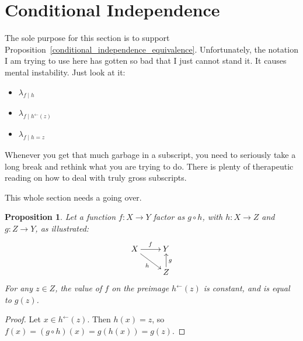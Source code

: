 \documentclass[
twoside=true,
paper=letter,
fontsize=11pt,
pagesize=auto,
leqno,
openany,
headsepline,
overfullrule,
]{scrbook}
\theoremstyle{plain}
\theoremstyle{plain}
\newtheorem{prop}[thm]{Proposition}
\theoremstyle{definition}
\theoremstyle{bfnoteitalic}
\theoremstyle{bfnoteroman}
\newcommand{\preimage}[1]{#1^{\leftarrow}}
\newcommand{\function}{f}
\newcommand{\functionii}{g}
\newcommand{\functioniii}{h}
\newcommand{\measurespace}{X}
\newcommand{\measurespaceii}{Y}
\newcommand{\measurespaceiii}{Z}
\newcommand{\mspaceelt}{x}
\newcommand{\mspaceeltiii}{z}
\newcommand{\measureiii}{\lambda}
\newcommand{\mkernel}[3]{#1_{#2\mid#3}}
\begin{document}
\section{Conditional Independence}

The sole purpose for this section is to support Proposition~\ref{conditional_independence_equivalence}. Unfortunately, the notation I am trying to use here has gotten so bad that I just cannot stand it.  It causes mental instability. Just look at it:
\begin{itemize}
\item
$\mkernel{\measureiii}{\function}{\functioniii}$
\item
$\mkernel{\measureiii}{\function}{\preimage{\functioniii}(\mspaceeltiii)}$
\item
$\mkernel{\measureiii}{\function}{\functioniii = \mspaceeltiii}$
\end{itemize}
Whenever you get that much garbage in a subscript, you need to seriously take a long break and rethink what you are trying to do. There is plenty of therapeutic reading on how to deal with truly gross subscripts.

This whole section needs a going over.


\begin{prop}\label{constant_on_preimage}
Let a function
$\function:\measurespace\to\measurespaceii$
factor as 
$\functionii\circ\functioniii$, 
with
$\functioniii:\measurespace\to\measurespaceiii$
and
$\functionii:\measurespaceiii\to\measurespaceii$,
as illustrated:
\[
\xymatrix@R=16pt{
\measurespace 
\ar[r]^\function 
\ar[dr]_\functioniii
& \measurespaceii \\
 & \measurespaceiii \ar[u]_\functionii \\
}
\]
For any $\mspaceeltiii\in\measurespaceiii$, the value of $\function$ on the preimage
$\preimage{\functioniii}(\mspaceeltiii)$ is constant, and is equal to
$\functionii(\mspaceeltiii)$.
\end{prop}

\begin{proof}
Let $\mspaceelt \in \preimage{\functioniii}(\mspaceeltiii)$. 
Then $\functioniii(\mspaceelt)=\mspaceeltiii$, so
$\function(\mspaceelt)
= (\functionii\circ\functioniii)(\mspaceelt)
= \functionii(\functioniii(\mspaceelt))
= \functionii(\mspaceeltiii)$.
\end{proof}
\end{document}
